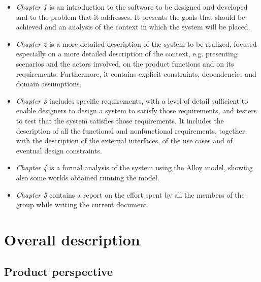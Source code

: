 \documentclass[a4paper,oneside,11pt]{book}   %
\begin{document}
    \begin{itemize}
        \item \emph{Chapter 1} is an introduction to the software to be designed and developed and to the problem that it addresses. It presents the goals that should be achieved and an analysis of the context in which the system will be placed.
        \item \emph{Chapter 2} is a more detailed description of the system to be realized, focused especially on a more detailed description of the context, e.g. presenting scenarios and the actors involved, on the product functions and on its requirements. Furthermore, it contains explicit constraints, dependencies and domain assumptions.
        \item \emph{Chapter 3} includes specific requirements, with a level of detail sufficient to enable designers to design a system to satisfy those requirements, and testers to test that the system satisfies those requirements. It includes the description of all the functional and nonfunctional requirements, together with the description of the external interfaces, of the use cases and of eventual design constraints.
        \item \emph{Chapter 4} is a formal analysis of the system using the Alloy model, showing also some worlds obtained running the model.
        \item \emph{Chapter 5} contains a report on the effort spent by all the members of the group while writing the current document.
    \end{itemize}

\chapter{Overall description}
    \section{Product perspective}
\end{document}
